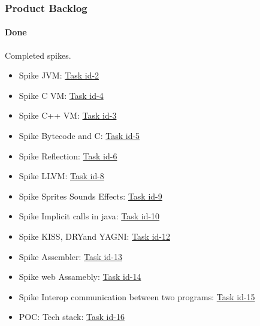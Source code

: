 \subsubsection{Product Backlog}

\paragraph{Done}
Completed spikes.
\begin{itemize}
    \item Spike JVM: \href{https://tree.taiga.io/project/joseluis-teran-coffeetime/us/2?milestone=390348}{Task id-2}
    \item Spike C VM: \href{https://tree.taiga.io/project/joseluis-teran-coffeetime/us/4?milestone=390348}{Task id-4}
    \item Spike C++ VM: \href{https://tree.taiga.io/project/joseluis-teran-coffeetime/us/3?milestone=390348}{Task id-3}
    \item Spike Bytecode and C: \href{https://tree.taiga.io/project/joseluis-teran-coffeetime/us/5?milestone=390348}{Task id-5}
    \item Spike Reflection: \href{https://tree.taiga.io/project/joseluis-teran-coffeetime/us/6?milestone=390348}{Task id-6}
    \item Spike LLVM: \href{https://tree.taiga.io/project/joseluis-teran-coffeetime/us/8?milestone=390348}{Task id-8}
    \item Spike Sprites Sounds Effects: \href{https://tree.taiga.io/project/joseluis-teran-coffeetime/us/9?milestone=390348}{Task id-9}
    \item Spike Implicit calls in java: \href{https://tree.taiga.io/project/joseluis-teran-coffeetime/us/10?milestone=390348}{Task id-10}
    \item Spike KISS, DRYand YAGNI: \href{https://tree.taiga.io/project/joseluis-teran-coffeetime/us/12?milestone=390348}{Task id-12}
    \item Spike Assembler: \href{https://tree.taiga.io/project/joseluis-teran-coffeetime/us/13?milestone=390348}{Task id-13}
    \item Spike web Assamebly: \href{https://tree.taiga.io/project/joseluis-teran-coffeetime/us/14?milestone=390348}{Task id-14}
    \item Spike Interop communication between two programs: \href{https://tree.taiga.io/project/joseluis-teran-coffeetime/us/15?milestone=390348}{Task id-15}
    \item POC: Tech stack: \href{https://tree.taiga.io/project/joseluis-teran-coffeetime/us/16?milestone=390348}{Task id-16}
\end{itemize}

